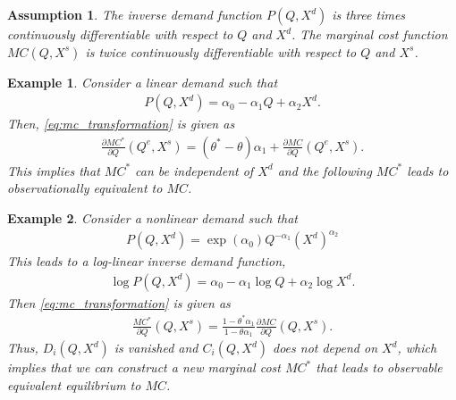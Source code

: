 \documentclass[11pt, a4paper]{article}
\newtheorem{assumption}{Assumption}
\newtheorem{example}{Example}
\theoremstyle{remark}
\begin{document}
\begin{assumption}\label{assumption:three_times_differentiable}
    The inverse demand function $P(Q, X^{d})$ is three times continuously differentiable with respect to $Q$ and $X^{d}$.
    The marginal cost function $MC(Q, X^{s})$ is twice continuously differentiable with respect to $Q$ and $X^{s}$.
\end{assumption}









\begin{example}\label{example:bresnahan_1982}
    Consider a linear demand such that
    \begin{align}
        P(Q, X^{d}) = \alpha_0 - \alpha_1Q + \alpha_2X^{d}.
    \end{align}
    Then, \eqref{eq:mc_transformation} is given as
    \begin{align}
        \frac{\partial MC^{*}}{\partial Q}(Q^e, X^{s}) = (\theta^{*} - \theta)\alpha_1 + \frac{\partial MC}{\partial Q}(Q^e, X^{s}).
    \end{align}
    This implies that $MC^{*}$ can be independent of $X^{d}$ and the following $MC^{*}$ leads to observationally equivalent to $MC$.
\end{example}
\begin{example}\label{example:log_linear}
    Consider a nonlinear demand such that
    \begin{align}
        P(Q, X^{d}) = \exp(\alpha_0)Q^{-\alpha_1}(X^{d})^{\alpha_2}
    \end{align}
    This leads to a log-linear inverse demand function,
    \begin{align}
        \log P(Q, X^{d} ) = \alpha_0 - \alpha_1 \log Q + \alpha_2 \log X^{d}.
    \end{align}
    Then \eqref{eq:mc_transformation} is given as
    \begin{align}
        \frac{MC^{*}}{\partial Q}(Q, X^{s}) = \frac{1 - \theta^{*} \alpha_1}{1 - \theta \alpha_1} \frac{\partial MC}{\partial Q}(Q, X^{s}). 
    \end{align}
    Thus, $D_i(Q, X^{d})$ is vanished and $C_i(Q,X^{d})$ does not depend on $X^{d}$, which implies that we can construct a new marginal cost $MC^{*}$ that leads to observable equivalent equilibrium to $MC$.
\end{example}
\end{document}
